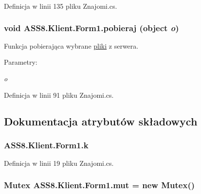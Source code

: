 Definicja w linii 135 pliku Znajomi.cs.\hypertarget{a00003_21b906fd66030071dd1057fe32efeca1}{
\subsubsection[{pobieraj}]{\setlength{\rightskip}{0pt plus 5cm}void ASS8.Klient.Form1.pobieraj (object {\em o})}}
\label{d1/d7c/a00003_21b906fd66030071dd1057fe32efeca1}


Funkcja pobierająca wybrane \hyperlink{a00017}{pliki} z serwera. 

\begin{Desc}
\item[Parametry:]
\begin{description}
\item[{\em o}]\end{description}
\end{Desc}


Definicja w linii 91 pliku Znajomi.cs.

\subsection{Dokumentacja atrybutów składowych}
\hypertarget{a00003_3a7a9649738431ac4b2dd14fdabb7d1c}{
\subsubsection[{k}]{ {\bf ASS8.Klient.Form1.k}}}
\label{d1/d7c/a00003_3a7a9649738431ac4b2dd14fdabb7d1c}




Definicja w linii 19 pliku Znajomi.cs.\hypertarget{a00003_26249d134376a8c1b9be63c9a2df68a2}{
\subsubsection[{mut}]{\setlength{\rightskip}{0pt plus 5cm}Mutex {\bf ASS8.Klient.Form1.mut} = new Mutex()}}
\label{d1/d7c/a00003_26249d134376a8c1b9be63c9a2df68a2}




